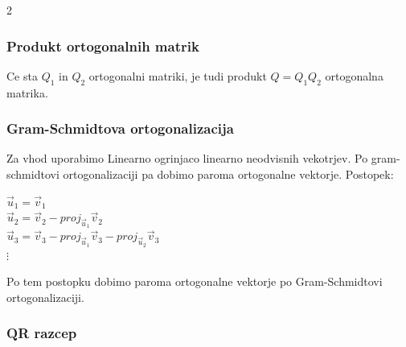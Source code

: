 \documentclass{article}
\begin{document}
\begin{multicols}{2}
	\subsubsection{Produkt ortogonalnih matrik}

	Ce sta $Q_{1}$ in $Q_{2}$ ortogonalni matriki, je tudi produkt $Q = Q_{1}Q_{2}$ ortogonalna
	matrika.

	\subsubsection{Gram-Schmidtova ortogonalizacija}

	Za vhod uporabimo Linearno ogrinjaco linearno neodvisnih vekotrjev. Po
	gram-schmidtovi ortogonalizaciji pa dobimo paroma ortogonalne vektorje.
	Postopek:
	\begin{center}
		\begin{math}
			\vec{u}_{1} = \vec{v}_{1}
		\end{math}\\
		\begin{math}
			\vec{u}_{2} = \vec{v}_{2} - proj_{\vec{u}_{1}}\vec{v}_{2}
		\end{math}\\
		\begin{math}
			\vec{u}_{3} = \vec{v}_{3} - proj_{\vec{u}_{1}}\vec{v}_{3} - proj_{\vec{u}_{2}}\vec{v}_{3}
		\end{math}\\
		\begin{math}
			\vdots
		\end{math}
	\end{center}
	Po tem postopku dobimo paroma ortogonalne vektorje po Gram-Schmidtovi ortogonalizaciji.


	\subsubsection{QR razcep}


\end{multicols}
\end{document}
